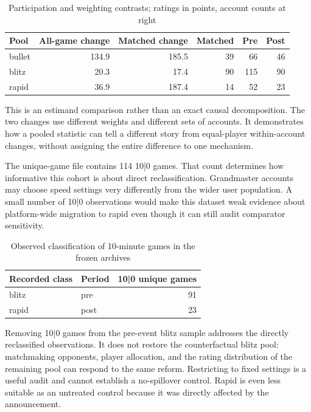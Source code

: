 \documentclass[11pt,a4paper]{article}
\begin{document}
\begin{table}[H]\centering\small\caption{Participation and weighting contrasts; ratings in points, account counts at right}\begin{tabular}{lrrrrr}\toprule

Pool & All-game change & Matched change & Matched & Pre & Post \\ \midrule

bullet & 134.9 & 185.5 & 39 & 66 & 46 \\

blitz & 20.3 & 17.4 & 90 & 115 & 90 \\

rapid & 36.9 & 187.4 & 14 & 52 & 23 \\

\bottomrule\end{tabular}\end{table}

This is an estimand comparison rather than an exact causal decomposition. The two changes use different weights and different sets of accounts. It demonstrates how a pooled statistic can tell a different story from equal-player within-account changes, without assigning the entire difference to one mechanism.

The unique-game file contains 114 10|0 games. That count determines how informative this cohort is about direct reclassification. Grandmaster accounts may choose speed settings very differently from the wider user population. A small number of 10|0 observations would make this dataset weak evidence about platform-wide migration to rapid even though it can still audit comparator sensitivity.

\begin{table}[H]\centering\small\caption{Observed classification of 10-minute games in the frozen archives}\begin{tabular}{llr}\toprule

Recorded class & Period & 10|0 unique games \\ \midrule

blitz & pre & 91 \\

rapid & post & 23 \\

\bottomrule\end{tabular}\end{table}

Removing 10|0 games from the pre-event blitz sample addresses the directly reclassified observations. It does not restore the counterfactual blitz pool: matchmaking opponents, player allocation, and the rating distribution of the remaining pool can respond to the same reform. Restricting to fixed settings is a useful audit and cannot establish a no-spillover control. Rapid is even less suitable as an untreated control because it was directly affected by the announcement.
\end{document}
